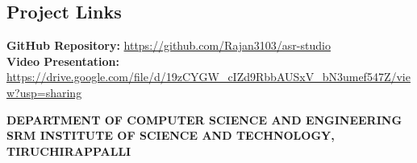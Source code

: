 \documentclass[11pt,a4paper]{article}
\begin{document}
\subsection*{Project Links}
\textbf{GitHub Repository:} \url{https://github.com/Rajan3103/asr-studio}\\
\textbf{Video Presentation:} \url{https://drive.google.com/file/d/19zCYGW_cIZd9RbbAUSxV_bN3umef547Z/view?usp=sharing}

\vspace{1cm}
\begin{center}
{\bfseries DEPARTMENT OF COMPUTER SCIENCE AND ENGINEERING}\\
{\bfseries SRM INSTITUTE OF SCIENCE AND TECHNOLOGY, TIRUCHIRAPPALLI}
\end{center}
\end{document}
